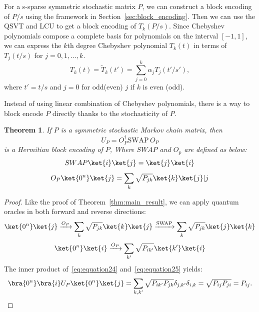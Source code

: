 \documentclass{article}
\newtheorem{theorem}{Theorem}[section]
\begin{document}
    For a s-sparse symmetric stochastic matrix $P$, we can construct a block encoding of $P/s$ using the framework in Section~\ref{sec:block_encoding}.
    Then we can use the QSVT and LCU to get a block encoding of $T_k(P/s)$. Since Chebyshev polynomials compose a complete basis for polynomials on the interval $[-1, 1]$, we can express
    the $k$th degree Chebyshev polynomial $T_k(t)$ in terms of $T_j(t/s)$ for $j = 0, 1, \ldots, k$.
    \begin{equation}
        T_k(t) = \widetilde{T}_k(t') = \sum_{j=0}^{k} \alpha_j T_j(t'/s'),\label{eq:equation21}
    \end{equation}
    where $t'= t/s$ and $j = 0$ for odd(even) $j$ if $k$ is even (odd).

    Instead of using linear combination of Chebyshev polynomials, there is a way to block encode $P$ directly thanks to the stochasticity of $P$.

    \begin{theorem}
        If $ P $ is a symmetric stochastic Markov chain matrix, then
        \begin{equation}
            U_P = O_P^\dagger \text{SWAP} \, O_P
            \label{eq:block_encoding}
        \end{equation}
        is a Hermitian block encoding of $ P $, Where $SWAP$ and $O_p$ are defined as below:
        \begin{equation}
            SWAP\ket{i}\ket{j} = \ket{j}\ket{i}\label{eq:equation22}
        \end{equation}
        \begin{equation}
            O_P \ket{0^n} \ket{j} = \sum_{k} \sqrt{P_{jk}} \ket{k} \ket{j}|j\label{eq:equation23}
        \end{equation}
    \end{theorem}

    \begin{proof}
        Like the proof of Theorem~\ref{thm:main_result}, we can apply quantum oracles in both forward and reverse directions:
        \begin{equation}
            \ket{0^n} \ket{j}
            \xrightarrow{O_P}
            \sum_{k} \sqrt{P_{jk}} \ket{k} \ket{j}
            \xrightarrow{\text{SWAP}}
            \sum_{k} \sqrt{P_{jk}} \ket{j} \ket{k}\label{eq:equation24}
        \end{equation}
        \begin{equation}
            \ket{0^n} \ket{i}
            \xrightarrow{O_P}
            \sum_{k'} \sqrt{P_{ik'}} \ket{k'} \ket{i}\label{eq:equation25}
        \end{equation}
        The inner product of~\ref{eq:equation24} and~\ref{eq:equation25} yields:
        \begin{equation}
            \bra{ 0^n} \bra{i} U_P \ket{0^n} \ket{j}
            = \sum_{k,k'} \sqrt{P_{ik'} P_{jk}} \delta_{j,k'} \delta_{i,k}
            = \sqrt{P_{ij} P_{ji}}
            = P_{ij}.\label{eq:equation26}
        \end{equation}
    \end{proof}
\end{document}

